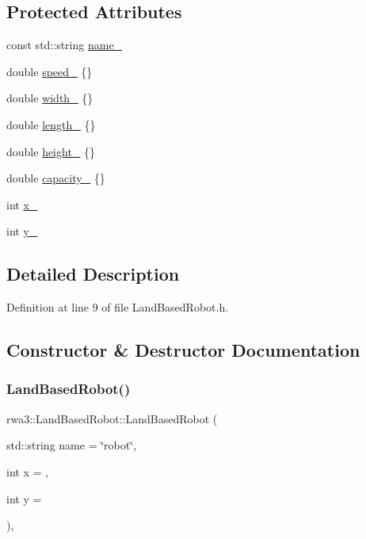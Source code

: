 \subsection*{Protected Attributes}
\begin{DoxyCompactItemize}
\item 
const std\+::string \hyperlink{classrwa3_1_1_land_based_robot_aa633266ad18ca432217297f7caabbbe2}{name\+\_\+}
\item 
double \hyperlink{classrwa3_1_1_land_based_robot_ad9831c30393edcd779041734db24d819}{speed\+\_\+} \{\}
\item 
double \hyperlink{classrwa3_1_1_land_based_robot_a04a444830f3ad0c0d78d206e0d598bbb}{width\+\_\+} \{\}
\item 
double \hyperlink{classrwa3_1_1_land_based_robot_ac4b3cde4702d4ea866f503eedf6ea1e3}{length\+\_\+} \{\}
\item 
double \hyperlink{classrwa3_1_1_land_based_robot_a1187f7a4fd44450abf81a1ad76f18f72}{height\+\_\+} \{\}
\item 
double \hyperlink{classrwa3_1_1_land_based_robot_aa717b15025b339a0f40f689452a97cf8}{capacity\+\_\+} \{\}
\item 
int \hyperlink{classrwa3_1_1_land_based_robot_a832cf3ec3e8226a5dca17f2177a5730a}{x\+\_\+}
\item 
int \hyperlink{classrwa3_1_1_land_based_robot_a2749e5dd4c77633f72eba70d269fdf59}{y\+\_\+}
\end{DoxyCompactItemize}


\subsection{Detailed Description}


Definition at line 9 of file Land\+Based\+Robot.\+h.



\subsection{Constructor \& Destructor Documentation}
\mbox{\label{classrwa3_1_1_land_based_robot_abc40ff92063f51e3bf8ac8b7728ca12a}} 
\subsubsection{\texorpdfstring{Land\+Based\+Robot()}{LandBasedRobot()}}
{\footnotesize\ttfamily rwa3\+::\+Land\+Based\+Robot\+::\+Land\+Based\+Robot (\begin{DoxyParamCaption}\item[{std\+::string}]{name = {\ttfamily \char`\"{}robot\char`\"{}},  }\item[{int}]{x = {},  }\item[{int}]{y = {} }\end{DoxyParamCaption})\hspace{0.3cm}{\ttfamily [inline]}, {\ttfamily [explicit]}}

